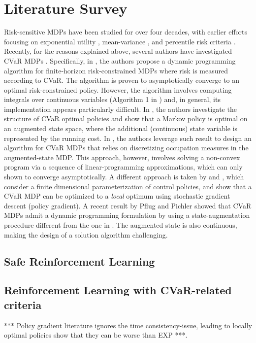 
\section{Literature Survey}\label{sec:prelim:literature}


Risk-sensitive MDPs have been studied for over four decades, with earlier efforts focusing on exponential utility \cite{Howard1972Risk}, mean-variance \cite{sobel_variance_1982}, and percentile risk criteria \cite{filar_percentile_1995} . Recently, for the reasons explained above, several authors have investigated CVaR MDPs \cite{rockafellar2000optimization}. Specifically, in \cite{borkar2014risk}, the authors propose a dynamic programming algorithm for finite-horizon risk-constrained MDPs where risk is measured according to CVaR. The algorithm is proven to asymptotically converge to an optimal risk-constrained policy. However, the algorithm involves computing  integrals over continuous variables (Algorithm 1 in \cite{borkar2014risk}) and, in general, its implementation appears particularly difficult. In \cite{bauerle2011markov}, the authors investigate the structure of CVaR optimal policies and show that a Markov policy is optimal on an augmented state space, where the additional (continuous) state variable is represented  by the running cost. In   \cite{haskell2014convex}, the authors leverage such result to design an algorithm for CVaR MDPs that relies on discretizing occupation measures in the augmented-state MDP. This approach, however, involves solving a non-convex program via a sequence of linear-programming approximations, which can only shown to converge asymptotically. A different approach is taken by \cite{chow2014cvar} and \cite{tamar2015optimizing}, which consider a finite dimensional parameterization of control  policies, and show that a CVaR MDP can be optimized to a \emph{local} optimum using stochastic gradient descent (policy gradient). A recent result by Pflug and Pichler \cite{pflug2012time} showed that CVaR MDPs admit a dynamic programming formulation by using a state-augmentation procedure different from the one in \cite{bauerle2011markov}. The augmented state  is also continuous, making the design of a solution algorithm challenging. 

\subsection{Safe Reinforcement Learning}

\citep{amodei2016concrete}
\citep{garcia2015comprehensive}
\citep{leike2017ai}
\citep{majumdar2017should}





\subsection{Reinforcement Learning with CVaR-related criteria}

*** Policy gradient literature ignores the time consistency-issue, leading to locally optimal policies show that they can be worse than EXP ***.
